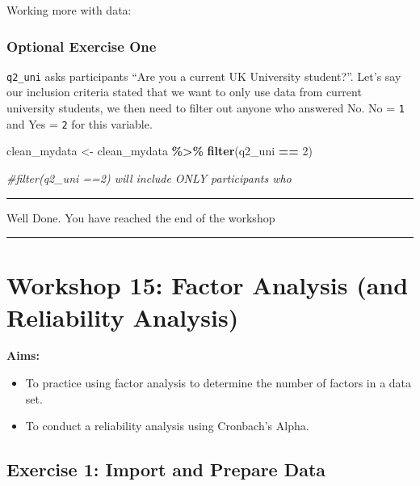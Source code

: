 \documentclass[
]{book}
\newenvironment{Shaded}{\begin{snugshade}}{\end{snugshade}}
\newcommand{\CommentTok}[1]{\textcolor[rgb]{0.56,0.35,0.01}{\textit{#1}}}
\newcommand{\DecValTok}[1]{\textcolor[rgb]{0.00,0.00,0.81}{#1}}
\newcommand{\FunctionTok}[1]{\textcolor[rgb]{0.13,0.29,0.53}{\textbf{#1}}}
\newcommand{\NormalTok}[1]{#1}
\newcommand{\OtherTok}[1]{\textcolor[rgb]{0.56,0.35,0.01}{#1}}
\newcommand{\SpecialCharTok}[1]{\textcolor[rgb]{0.81,0.36,0.00}{\textbf{#1}}}
\providecommand{\tightlist}{%
  \setlength{\itemsep}{0pt}\setlength{\parskip}{0pt}}
\let\oldsection\section
\renewcommand{\section}{\needspace{5\baselineskip}\oldsection}
\let\oldsubsection\subsection
\renewcommand{\subsection}{\needspace{3\baselineskip}\oldsubsection}  %
\begin{document}
Working more with data:

\subsection{\texorpdfstring{\textbf{Optional Exercise One}}{Optional Exercise One}}\label{optional-exercise-one}

\texttt{q2\_uni} asks participants ``Are you a current UK University student?''.
Let's say our inclusion criteria stated that we want to only use data from current university students, we then need to filter out anyone who answered No.
No = \texttt{1} and Yes = \texttt{2} for this variable.

\begin{Shaded}
\begin{Highlighting}[]
\NormalTok{clean\_mydata }\OtherTok{\textless{}{-}}\NormalTok{ clean\_mydata }\SpecialCharTok{\%\textgreater{}\%}
  \FunctionTok{filter}\NormalTok{(q2\_uni }\SpecialCharTok{==} \DecValTok{2}\NormalTok{)}

\CommentTok{\#filter(q2\_uni ==2) will include ONLY participants who }
\end{Highlighting}
\end{Shaded}

\begin{center}\rule{0.5\linewidth}{0.5pt}\end{center}

Well Done.
You have reached the end of the workshop

\begin{center}\rule{0.5\linewidth}{0.5pt}\end{center}

\chapter{Workshop 15: Factor Analysis (and Reliability Analysis)}\label{workshop-15-factor-analysis-and-reliability-analysis}

\textbf{Aims:}

\begin{itemize}
\tightlist
\item
  To practice using factor analysis to determine the number of factors in a data set.
\item
  To conduct a reliability analysis using Cronbach's Alpha.
\end{itemize}

\section{Exercise 1: Import and Prepare Data}\label{exercise-1-import-and-prepare-data-1}
\end{document}

